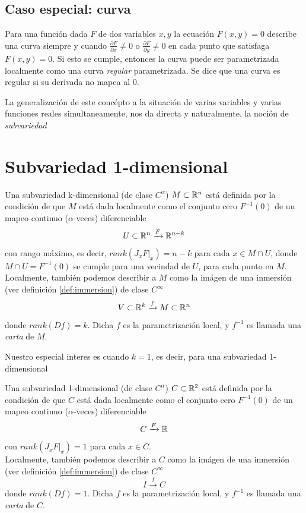 \subsection{Caso especial: curva}

Para una funci\'on dada $F$ de dos variables $x,y$ la ecuaci\'on $F(x,y) = 0$ describe
una curva siempre y cuando $\frac{\partial F}{\partial x} \ne 0$ o $\frac{\partial F}{\partial y} \ne 0$
en cada punto que satisfaga $F(x,y) = 0$. Si esto se cumple, entonces la curva puede ser
parametrizada localmente como una curva \emph{regular} parametrizada. Se dice que una curva 
es regular si su derivada no mapea al $0$.

La generalizaci\'on de este conc\'epto a la situaci\'on de varias variables y varias funciones
reales simultaneamente, nos da directa y naturalmente, la noci\'on de \emph{subvariedad}

\section{Subvariedad 1-dimensional}

\begin{definition}[Subvariedad]
    Una subvariedad k-dimensional (de clase $C^{\alpha}$) $M \subset \mathbb{R}^{n}$ está definida por
    la condici\'on  de que $M$ est\'a dada localmente como el conjunto cero $F^{-1}(0)$ de un
    mapeo continuo ($\alpha$-veces) diferenciable
    $$ U \subset \mathbb{R}^{n}  \xrightarrow{F} \mathbb{R}^{n-k}$$
    con rango m\'aximo, es decir, $rank(J_{x}F|_{x})= n - k$ para cada $x \in M \cap U$, donde
    $M \cap U = F^{-1}(0)$ se cumple para una vecindad de $U$, para cada punto en $M$. \\
    Localmente, tambi\'en podemos describir a $M$ como la im\'agen de una inmersi\'on (ver
    definici\'on \ref{def:immersion}) de clase $C^{\infty}$
    $$ V \subset \mathbb{R}^{k} \xrightarrow{f} M \subset \mathbb{R}^{n} $$
    donde $rank(Df)=k$. Dicha $f$ es la parametrizaci\'on local, y $f^{-1}$ es llamada una \emph{carta}
    de $M$.
\end{definition}

Nuestro especial interes es cuando $k=1$, es decir, para una subvariedad 1-dimensional

\begin{definition}
    Una subvariedad 1-dimensional (de clase $C^{\alpha}$) $C \subset \mathbb{R}^{2}$ está definida por
    la condici\'on  de que $C$ est\'a dada localmente como el conjunto cero $F^{-1}(0)$ de un
    mapeo continuo ($\alpha$-veces) diferenciable
    $$ C \xrightarrow{F} \mathbb{R}$$
    con $rank(J_{x}F|_{x})= 1$ para cada $x \in C$.
    \\
    Localmente, tambi\'en podemos describir a $C$ como la im\'agen de una inmersi\'on (ver
    definici\'on \ref{def:immersion})
    de clase
    $C^{\infty}$
    $$ I  \xrightarrow{f} C $$
    donde $rank(Df)=1$. Dicha $f$ es la parametrizaci\'on local, y $f^{-1}$ es llamada una \emph{carta}
    de $C$.
\end{definition}

